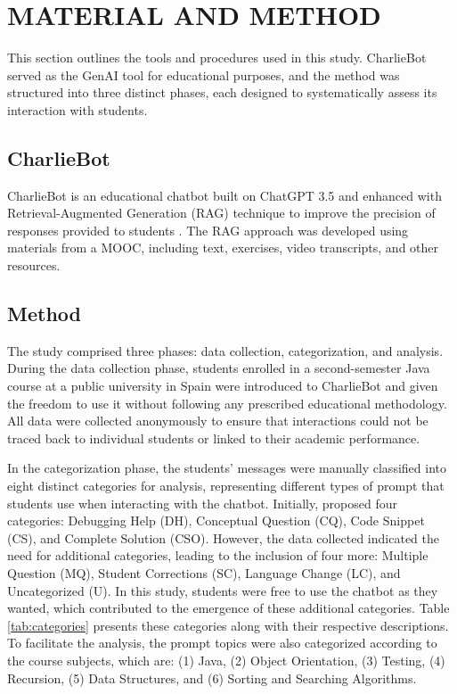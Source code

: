 \documentclass[a4paper,twoside]{article}
\begin{document}
\section{\uppercase{Material and Method}}

This section outlines the tools and procedures used in this study. CharlieBot
served as the GenAI tool for educational purposes, and the method was structured
into three distinct phases, each designed to systematically assess its
interaction with students.

\subsection{CharlieBot}

CharlieBot is an educational chatbot built on ChatGPT 3.5 and enhanced with
Retrieval-Augmented Generation (RAG) technique to improve the precision of
responses provided to students \citep{Sun24}. The RAG approach was developed
using materials from a MOOC, including text, exercises, video transcripts, and
other resources.

\subsection{Method}

The study comprised three phases: data collection, categorization, and analysis.
During the data collection phase, students enrolled in a second-semester Java
course at a public university in Spain were introduced to CharlieBot and given
the freedom to use it without following any prescribed educational methodology.
All data were collected anonymously to ensure that interactions could not be
traced back to individual students or linked to their academic performance.

In the categorization phase, the students' messages were manually classified
into eight distinct categories for analysis, representing different types of
prompt that students use when interacting with the chatbot. Initially,
\cite{Ghimire24} proposed four categories: Debugging Help (DH), Conceptual
Question (CQ), Code Snippet (CS), and Complete Solution (CSO). However, the data
collected indicated the need for additional categories, leading to the inclusion
of four more: Multiple Question (MQ), Student Corrections (SC), Language Change
(LC), and Uncategorized (U). In this study, students were free to use the
chatbot as they wanted, which contributed to the emergence of these additional
categories. Table \ref{tab:categories} presents these categories along with
their respective descriptions. To facilitate the analysis, the prompt topics
were also categorized according to the course subjects, which are: (1) Java, (2)
Object Orientation, (3) Testing, (4) Recursion, (5) Data Structures, and (6)
Sorting and Searching Algorithms.
\end{document}
